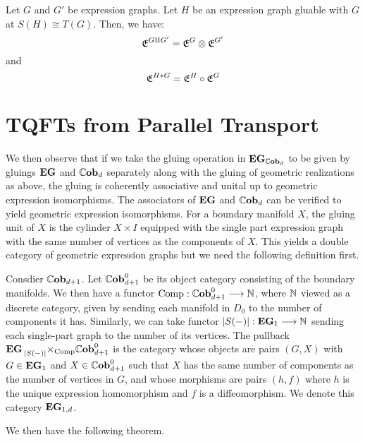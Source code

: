 \documentclass[./Thick_TQFTs_and_Quantum_Information.tex]{subfiles}
\begin{document}
\begin{thm}
Let $G$ and $G'$ be expression graphs. Let $H$ be an expression graph gluable
with $G$ at $S(H) \cong T(G)$. Then, we have:
\[
  \mathfrak{E}^{G \amalg G'} = \mathfrak{E}^{G} \otimes \mathfrak{E}^{G'}
\]
and
\[
  \mathfrak{E}^{H * G} = \mathfrak{E}^{H} \circ \mathfrak{E}^{G}
\]
\end{thm}

\section{TQFTs from Parallel Transport}

We then observe that if we take the gluing
operation in $\textbf{EG}_{\mathbb{C}\textbf{ob}_{d}}$ to be given by gluings $\textbf{EG}$ and $\mathbb{C}\textbf{ob}_{d}$
separately along with the gluing of geometric realizations as above, the gluing
is coherently associative and unital up to geometric expression isomorphisms.
The associators of $\textbf{EG}$ and $\mathbb{C}\textbf{ob}_{d}$ can be verified to yield geometric
expression isomorphisms. For a boundary manifold $X$, the gluing unit of $X$ is
the cylinder $X \times I$ equipped with the single part expression graph with
the same number of vertices as the components of $X$. This yields a double
category of geometric expression graphs but we need the following definition
first.

\begin{defn}
Consdier $\mathbb{C}\textbf{ob}_{d + 1}$. Let $\mathbb{C}\textbf{ob}_{d + 1}^0$ be its object category
consisting of the boundary manifolds. We then have a functor
$\text{Comp} : \mathbb{C}\textbf{ob}_{d + 1}^0 \stackrel{}{\longrightarrow} \mathbb{N}$, where $\mathbb{N}$ viewed as a discrete
category, given by sending each manifold in $D_0$ to the number of components it
has. Similarly, we can take functor $|S(-)| : \textbf{EG}_1 \stackrel{}{\longrightarrow} \mathbb{N}$ sending each
single-part graph to the number of its vertices. The pullback
$\textbf{EG} \prescript{}{|S(-)|}{\times}_{\text{Comp}} \mathbb{C}\textbf{ob}_{d + 1}^0$ is the category
whose objects are pairs $(G, X)$ with $G \in \textbf{EG}_1$ and $X \in \mathbb{C}\textbf{ob}_{d + 1}^0$
such that $X$ has the same number of components as the number of vertices in
$G$, and whose morphisms are pairs $(h, f)$ where $h$ is the unique expression
homomorphism and $f$ is a diffeomorphism. We denote this category $\textbf{EG}_{1, d}$.
\end{defn}

We then have the following theorem. 
\end{document}
